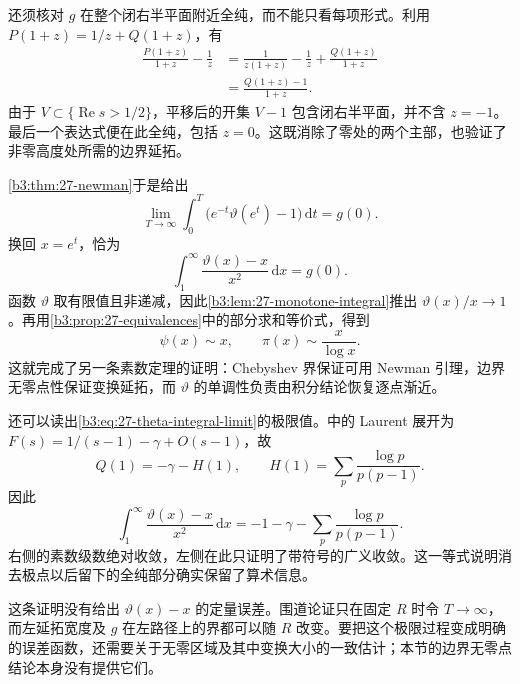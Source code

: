 还须核对 \(g\) 在整个闭右半平面附近全纯，而不能只看每项形式。利用 \(P(1+z)=1/z+Q(1+z)\)，有
\[
 \begin{aligned}
 \frac{P(1+z)}{1+z}-\frac1z
 &=\frac1{z(1+z)}-\frac1z+\frac{Q(1+z)}{1+z}\\
 &=\frac{Q(1+z)-1}{1+z}.
 \end{aligned}
\]
由于 \(V\subset\{\operatorname{Re}s>1/2\}\)，平移后的开集 \(V-1\) 包含闭右半平面，并不含 \(z=-1\)。最后一个表达式便在此全纯，包括 \(z=0\)。这既消除了零处的两个主部，也验证了非零高度处所需的边界延拓。

\cref{b3:thm:27-newman}于是给出
\[
 \lim_{T\to\infty}\int_0^T
       \bigl(e^{-t}\vartheta(e^t)-1\bigr)\,\mathrm dt=g(0).
\]
换回 \(x=e^t\)，恰为
\begin{equation}\label{b3:eq:27-theta-integral-limit}
 \int_1^\infty\frac{\vartheta(x)-x}{x^2}\,\mathrm dx=g(0).
\end{equation}
函数 \(\vartheta\) 取有限值且非递减，因此\cref{b3:lem:27-monotone-integral}推出 \(\vartheta(x)/x\to1\)。再用\cref{b3:prop:27-equivalences}中的部分求和等价式，得到
\[
 \psi(x)\sim x,\qquad \pi(x)\sim\frac{x}{\log x}.
\]
这就完成了另一条素数定理的证明：Chebyshev 界保证可用 Newman 引理，边界无零点性保证变换延拓，而 \(\vartheta\) 的单调性负责由积分结论恢复逐点渐近。

还可以读出\eqref{b3:eq:27-theta-integral-limit}的极限值。中的 Laurent 展开为
\(F(s)=1/(s-1)-\gamma+O(s-1)\)，故
\[
 Q(1)=-\gamma-H(1),\qquad
 H(1)=\sum_p\frac{\log p}{p(p-1)}.
\]
因此
\[
 \int_1^\infty\frac{\vartheta(x)-x}{x^2}\,\mathrm dx
 =-1-\gamma-\sum_p\frac{\log p}{p(p-1)}.
\]
右侧的素数级数绝对收敛，左侧在此只证明了带符号的广义收敛。这一等式说明消去极点以后留下的全纯部分确实保留了算术信息。

这条证明没有给出 \(\vartheta(x)-x\) 的定量误差。围道论证只在固定 \(R\) 时令 \(T\to\infty\)，而左延拓宽度及 \(g\) 在左路径上的界都可以随 \(R\) 改变。要把这个极限过程变成明确的误差函数，还需要关于无零区域及其中变换大小的一致估计；本节的边界无零点结论本身没有提供它们。

